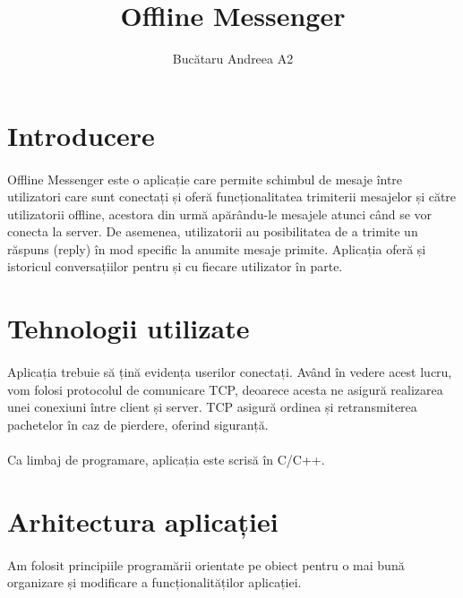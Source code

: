 \documentclass[runningheads]{llncs}
\title{Offline Messenger}
\author{Bucătaru Andreea A2}
\institute{Facultatea de Informatică, Iași}
\begin{document}
\maketitle
\noindent
{}

\section{Introducere}
\paragraph{}
Offline Messenger este o aplicație care permite schimbul de mesaje între utilizatori care sunt conectați și oferă
funcționalitatea trimiterii mesajelor și către utilizatorii offline, acestora din urmă apărându-le mesajele atunci
când se vor conecta la server. De asemenea, utilizatorii au posibilitatea de a trimite un răspuns (reply) în mod
specific la anumite mesaje primite. Aplicația oferă și istoricul conversațiilor pentru și cu fiecare utilizator
în parte.

\section{Tehnologii utilizate}
\paragraph{}
Aplicația trebuie să țină evidența userilor conectați. Având în vedere acest lucru, vom folosi protocolul de comunicare TCP, deoarece
acesta ne asigură realizarea unei conexiuni între client și server. TCP asigură ordinea și retransmiterea pachetelor în caz de pierdere, oferind siguranță.
\vspace{-4mm}
\paragraph{}
Ca limbaj de programare, aplicația este scrisă în C/C++.

\section{Arhitectura aplicației}
\paragraph{}
Am folosit principiile programării orientate pe obiect pentru o mai bună organizare și modificare a 
funcționalităților aplicației.
\vspace{-4mm}
\end{document}
